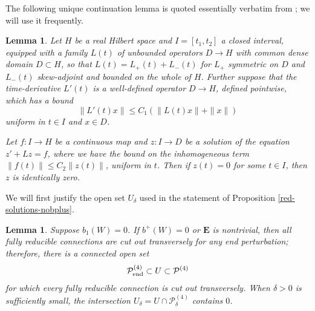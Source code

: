 \documentclass{memo-l}
\newtheorem{lemma}[theorem]{Lemma}
\theoremstyle{definition}
\theoremstyle{remark}
\numberwithin{section}{chapter}
\numberwithin{equation}{chapter}
\begin{document}
The following unique continuation lemma is quoted essentially verbatim from \cite[Lemma~7.1.3]{KMSW}; we will use it frequently.

\begin{lemma}\label{Unique}Let $H$ be a real Hilbert space and $I = [t_1, t_2]$ a closed interval, equipped with a family $L(t)$ of unbounded operators $D \to H$ with common dense domain $D\subset H$, so that $L(t) = L_+(t) + L_-(t)$ for $L_+$ symmetric on $D$ and $L_-(t)$ skew-adjoint and bounded on the whole of $H$. Further suppose that the time-derivative $L'(t)$ is a well-defined operator $D \to H$, defined pointwise, which has a bound $$\|L'(t)x\| \leq C_1(\|L(t)x\| + \|x\|)$$ uniform in $t\in I$ and $x \in D$.

Let $f: I \to H$ be a continuous map and $z: I \to D$ be a solution of the equation $z' + Lz = f$, where we have the bound on the inhomogeneous term $\|f(t)\| \leq C_2\|z(t)\|$, uniform in $t$. Then if $z(t) = 0$ for some $t \in I$, then $z$ is identically zero.
\end{lemma}

We will first justify the open set $U_\delta$ used in the statement of Proposition \ref{red-solutions-nobplus}.

\begin{lemma}\label{Trivial-transverse}Suppose $b_1(W) = 0$. If $b^+(W) = 0$ or $\mathbf{E}$ is nontrivial, then all fully reducible connections are cut out transversely for any end perturbation; therefore, there is a connected open set 
$$\mathcal P^{(4)}_{\textup{end}} \subset U\subset \mathcal P^{(4)}$$
for which every fully reducible connection is cut out transversely. When $\delta > 0$ is sufficiently small, the intersection $U_\delta = U \cap \mathcal P^{(4)}_\delta$ contains $0$.
\end{lemma}
\end{document}
